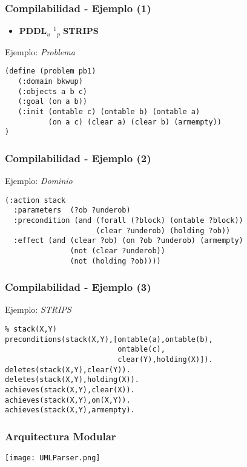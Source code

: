 \documentclass[bigger]{beamer}
\begin{document}
\begin{frame}[fragile]
\frametitle{Compilabilidad - Ejemplo (1)}
\label{sec-5.6}
\begin{itemize}

\item \textbf{PDDL$_{u}$} \preccurlyeq$^{1}$$_{p}$ \textbf{STRIPS}\\
\label{sec-5.6.1}%
\end{itemize} %
\begin{block}{Ejemplo: \emph{Problema}}
\label{sec-5.6.2}

 \begin{verbatim}
(define (problem pb1)
   (:domain bkwup)
   (:objects a b c)
   (:goal (on a b))
   (:init (ontable c) (ontable b) (ontable a) 
          (on a c) (clear a) (clear b) (armempty))
)
 \end{verbatim}
\end{block}
\end{frame}
\begin{frame}[fragile]
\frametitle{Compilabilidad - Ejemplo (2)}
\label{sec-5.7}
\begin{block}{Ejemplo: \emph{Dominio}}
\label{sec-5.7.1}

 \begin{verbatim}
(:action stack
  :parameters  (?ob ?underob)
  :precondition (and (forall (?block) (ontable ?block))
                     (clear ?underob) (holding ?ob))
  :effect (and (clear ?ob) (on ?ob ?underob) (armempty)
               (not (clear ?underob)) 
               (not (holding ?ob))))
 \end{verbatim}
\end{block}
\end{frame}
\begin{frame}[fragile]
\frametitle{Compilabilidad - Ejemplo (3)}
\label{sec-5.8}
\begin{block}{Ejemplo: \emph{STRIPS}}
\label{sec-5.8.1}

 \begin{verbatim}
% stack(X,Y)
preconditions(stack(X,Y),[ontable(a),ontable(b),
                          ontable(c),
                          clear(Y),holding(X)]).
deletes(stack(X,Y),clear(Y)).
deletes(stack(X,Y),holding(X)).
achieves(stack(X,Y),clear(X)).
achieves(stack(X,Y),on(X,Y)).
achieves(stack(X,Y),armempty).
 \end{verbatim}
\end{block}
\end{frame}
\begin{frame}
\frametitle{Arquitectura Modular}
\label{sec-5.9}

\begin{center} \texttt{[image: UMLParser.png]} \end{center} 
\end{frame}
\end{document}
